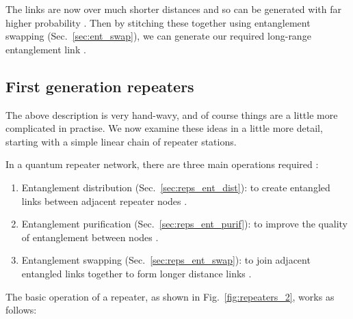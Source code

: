 \documentclass[twocolumn, aps, rmp, amsmath, amssymb, nofootinbib, superscriptaddress, longbibliography, floatfix, table-of-contents, eqsecnum]{revtex4-1}
\begin{document}
The links are now over much shorter distances and so can be generated with far higher probability \cite{}. Then by stitching these together using entanglement swapping (Sec.~\ref{sec:ent_swap}), we can generate our required long-range entanglement link \cite{}.

\subsection{First generation repeaters}

The above description is very hand-wavy, and of course things are a little more complicated in practise. We now examine these ideas in a little more detail, starting with a simple linear chain of repeater stations. 

In a quantum repeater network, there are three main operations required \cite{}:
\begin{enumerate}
\item Entanglement distribution (Sec.~\ref{sec:reps_ent_dist}): to create entangled links between adjacent repeater nodes \cite{}.
\item Entanglement purification (Sec.~\ref{sec:reps_ent_purif}): to improve the quality of entanglement between nodes \cite{}.
\item Entanglement swapping (Sec.~\ref{sec:reps_ent_swap}): to join adjacent entangled links together to form longer distance links \cite{}.
\end{enumerate}
The basic operation of a repeater, as shown in Fig.~\ref{fig:repeaters_2}, works as follows:
\end{document}
